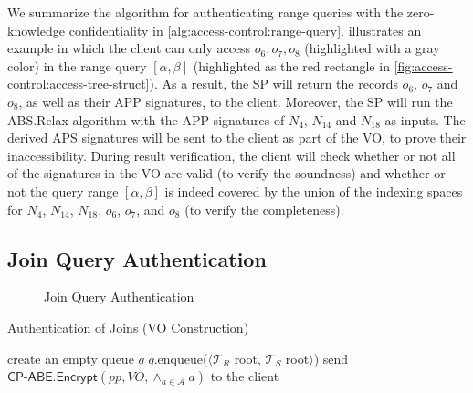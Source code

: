 We summarize the algorithm for authenticating range queries with the zero-knowledge confidentiality in \cref{alg:access-control:range-query}.
 illustrates an example in which the client can only access $o_6, o_7, o_8$ (highlighted with a gray color) in the range query $[\alpha,\beta]$ (highlighted as the red rectangle in \cref{fig:access-control:access-tree-struct}). As a result, the SP will return the records $o_6$, $o_7$ and $o_8$, as well as their APP signatures, to the client. Moreover, the SP will run the \textsf{ABS.Relax} algorithm with the APP signatures of $N_4$, $N_{14}$ and $N_{18}$ as inputs. The derived APS signatures will be sent to the client as part of the VO, to prove their inaccessibility. During result verification, the client will check whether or not all of the signatures in the VO are valid (to verify the soundness) and whether or not the query range $[\alpha, \beta]$ is indeed covered by the union of the indexing spaces for $N_4$, $N_{14}$, $N_{18}$, $o_6$, $o_7$, and $o_8$ (to verify the completeness).

\subsection{Join Query Authentication}

\begin{figure}[t]
  \centering
  \resizebox{.75\linewidth}{!}{}
  \caption{Join Query Authentication}\label{fig:access-control:join}
\end{figure}

\begin{algorithm}[t]
  \caption{Authentication of Joins (VO Construction)}\label{alg:access-control:join-query}
  create an empty queue $q$\;
  $q$.enqueue($\langle \mathcal{T}_R$ root, $\mathcal{T}_S$ root$\rangle$)\; %
  send $\textsf{CP-ABE.Encrypt}(pp, VO, \land_{a \in \mathcal{A}} a)$ to the client\;
\end{algorithm}


